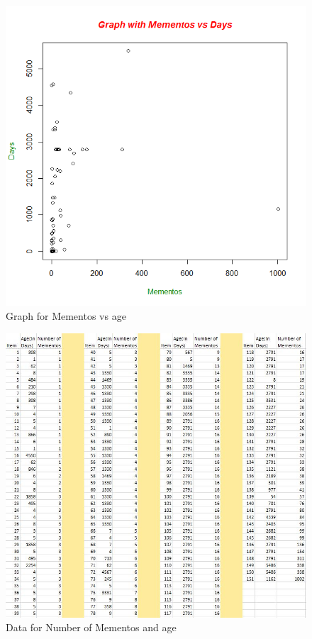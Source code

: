\newpage
\begin{figure}[h!]
\begin{center}
\includegraphics[scale=0.55, keepaspectratio=true]{figures/q3graph.png}
\caption{Graph for Mementos vs age}
\label{fig:fig1}
\end{center}
\end{figure}

\newpage
\begin{figure}[h!]
\begin{center}
\includegraphics[scale=0.55, keepaspectratio=true]{figures/data.JPG}
\caption{Data for Number of Mementos and age}
\label{fig:fig2}
\end{center}
\end{figure}

